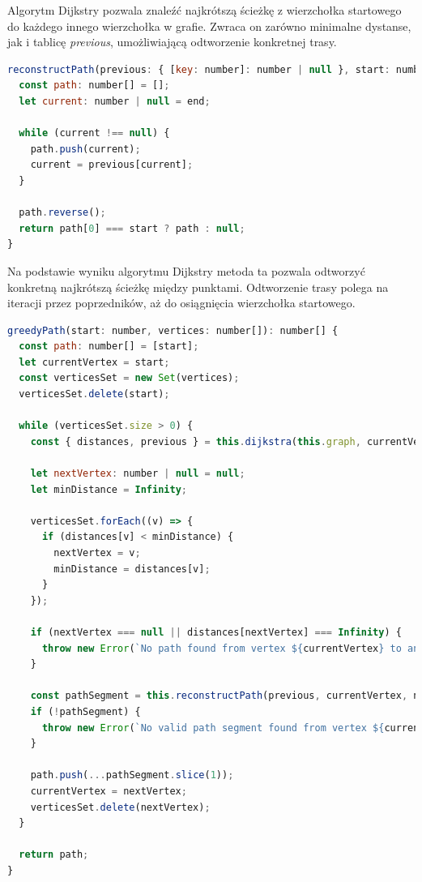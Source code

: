 Algorytm Dijkstry pozwala znaleźć najkrótszą ścieżkę z wierzchołka startowego do każdego innego wierzchołka w grafie. Zwraca on zarówno minimalne dystanse, jak i tablicę \textit{previous}, umożliwiającą odtworzenie konkretnej trasy.

\begin{lstlisting}[language=JavaScript, caption={Odtwarzanie ścieżki na podstawie tablicy poprzedników}, label={lst:pathfinding_reconstruct}]
reconstructPath(previous: { [key: number]: number | null }, start: number, end: number): number[] | null {
  const path: number[] = [];
  let current: number | null = end;

  while (current !== null) {
    path.push(current);
    current = previous[current];
  }

  path.reverse();
  return path[0] === start ? path : null;
}
\end{lstlisting}

Na podstawie wyniku algorytmu Dijkstry metoda ta pozwala odtworzyć konkretną najkrótszą ścieżkę między punktami. Odtworzenie trasy polega na iteracji przez poprzedników, aż do osiągnięcia wierzchołka startowego.

\begin{lstlisting}[language=JavaScript, caption={Zachłanne wyznaczanie trasy odwiedzającej dane sekcje}, label={lst:pathfinding_greedy}]
greedyPath(start: number, vertices: number[]): number[] {
  const path: number[] = [start];
  let currentVertex = start;
  const verticesSet = new Set(vertices);
  verticesSet.delete(start);

  while (verticesSet.size > 0) {
    const { distances, previous } = this.dijkstra(this.graph, currentVertex);

    let nextVertex: number | null = null;
    let minDistance = Infinity;

    verticesSet.forEach((v) => {
      if (distances[v] < minDistance) {
        nextVertex = v;
        minDistance = distances[v];
      }
    });

    if (nextVertex === null || distances[nextVertex] === Infinity) {
      throw new Error(`No path found from vertex ${currentVertex} to any remaining vertex`);
    }

    const pathSegment = this.reconstructPath(previous, currentVertex, nextVertex);
    if (!pathSegment) {
      throw new Error(`No valid path segment found from vertex ${currentVertex} to vertex ${nextVertex}`);
    }

    path.push(...pathSegment.slice(1));
    currentVertex = nextVertex;
    verticesSet.delete(nextVertex);
  }

  return path;
}
\end{lstlisting}

